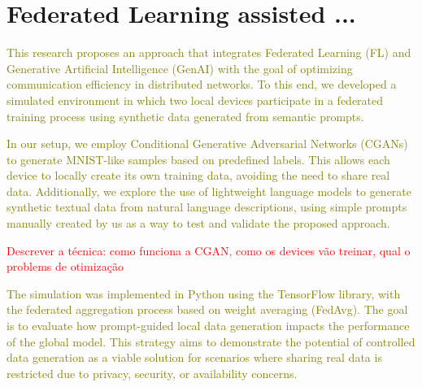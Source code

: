 \documentclass[conference,twocolumn]{IEEEtran}
\newcommand{\gpr}{\textcolor{olive}}
\newcommand{\colr}{\textcolor{red}}
\begin{document}
\section{Federated Learning assisted ...}
\gpr{This research proposes an approach that integrates Federated Learning (FL) and Generative Artificial Intelligence (GenAI) with the goal of optimizing communication efficiency in distributed networks. To this end, we developed a simulated environment in which two local devices participate in a federated training process using synthetic data generated from semantic prompts.}\par

\gpr{In our setup, we employ Conditional Generative Adversarial Networks (CGANs) to generate MNIST-like samples based on predefined labels. This allows each device to locally create its own training data, avoiding the need to share real data. Additionally, we explore the use of lightweight language models to generate synthetic textual data from natural language descriptions, using simple prompts manually created by us as a way to test and validate the proposed approach.}\par

\colr{Descrever a técnica: como funciona a CGAN, como os devices vão treinar, qual o problems de otimização}

\gpr{The simulation was implemented in Python using the TensorFlow library, with the federated aggregation process based on weight averaging (FedAvg). The goal is to evaluate how prompt-guided local data generation impacts the performance of the global model. This strategy aims to demonstrate the potential of controlled data generation as a viable solution for scenarios where sharing real data is restricted due to privacy, security, or availability concerns.}\par


\end{document}
